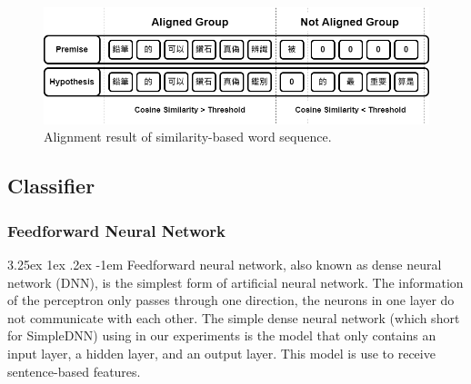 \documentclass[12pt]{article}
\makeatletter
\renewcommand\paragraph{\@startsection{paragraph}{5}{\z@}%
  {3.25ex \@plus1ex \@minus.2ex}%
  {-1em}%
  {\normalfont\normalsize\bfseries}}
\makeatother
\begin{document}
\begin{CJK*}{UTF8}{bkai}
\begin{spacing}{1.77}
\begin{figure}[H]
  \centering
  \includegraphics[width=\textwidth]{Groups.png}
  \caption[Alignment Result of Similarity-based Word Sequence]{Alignment result of similarity-based word sequence.}
  \label{fig:wag_groups}
\end{figure}

\subsection{Classifier}

\subsubsection{Feedforward Neural Network} \label{section:simple_dnn}
\paragraph{}
Feedforward neural network, also known as dense neural network (DNN), is the simplest form of artificial neural network. The information of the perceptron only passes through one direction, the neurons in one layer do not communicate with each other. The simple dense neural network (which short for SimpleDNN) using in our experiments is the model that only contains an input layer, a hidden layer, and an output layer. This model is use to receive sentence-based features.


\end{spacing}
\end{CJK*}
\end{document}

